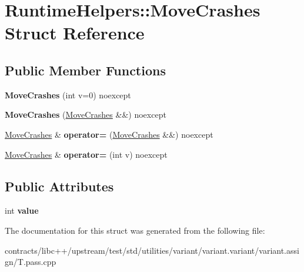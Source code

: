\hypertarget{struct_runtime_helpers_1_1_move_crashes}{}\section{Runtime\+Helpers\+:\+:Move\+Crashes Struct Reference}
\label{struct_runtime_helpers_1_1_move_crashes}
\subsection*{Public Member Functions}
\begin{DoxyCompactItemize}
\item 
\mbox{\label{struct_runtime_helpers_1_1_move_crashes_a6406248f02933af3dbb6e5624708fd4d}} 
{\bfseries Move\+Crashes} (int v=0) noexcept
\item 
\mbox{\label{struct_runtime_helpers_1_1_move_crashes_af01d5cc91653996e9271da52405e8c4a}} 
{\bfseries Move\+Crashes} (\mbox{\hyperlink{struct_runtime_helpers_1_1_move_crashes}{Move\+Crashes}} \&\&) noexcept
\item 
\mbox{\label{struct_runtime_helpers_1_1_move_crashes_a01392a3e1fdd128bc9a848a06c461eb1}} 
\mbox{\hyperlink{struct_runtime_helpers_1_1_move_crashes}{Move\+Crashes}} \& {\bfseries operator=} (\mbox{\hyperlink{struct_runtime_helpers_1_1_move_crashes}{Move\+Crashes}} \&\&) noexcept
\item 
\mbox{\label{struct_runtime_helpers_1_1_move_crashes_a01eb51f099e5f07af89635b79d0927ae}} 
\mbox{\hyperlink{struct_runtime_helpers_1_1_move_crashes}{Move\+Crashes}} \& {\bfseries operator=} (int v) noexcept
\end{DoxyCompactItemize}
\subsection*{Public Attributes}
\begin{DoxyCompactItemize}
\item 
\mbox{\label{struct_runtime_helpers_1_1_move_crashes_ae0e96a5f78508143d7b4e1f79fbaf06a}} 
int {\bfseries value}
\end{DoxyCompactItemize}


The documentation for this struct was generated from the following file\+:\begin{DoxyCompactItemize}
\item 
contracts/libc++/upstream/test/std/utilities/variant/variant.\+variant/variant.\+assign/T.\+pass.\+cpp\end{DoxyCompactItemize}
